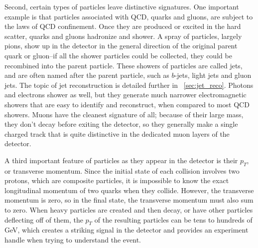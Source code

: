 Second, certain types of particles leave distinctive signatures.  One important example is that particles associated with QCD, quarks and gluons, are subject to the laws of QCD confinement.  Once they are produced or excited in the hard scatter, quarks and gluons hadronize and shower.  A spray of particles, largely pions, show up in the detector in the general direction of the original parent quark or gluon--if all the shower particles could be collected, they could be recombined into the parent particle.  These showers of particles are called jets, and are often named after the parent particle, such as $b$-jets, light jets and gluon jets.  The topic of jet reconstruction is detailed further in ~\ref{sec:jet_reco}.  Photons and electrons shower as well, but they generate much narrower electromagnetic showers that are easy to identify and reconstruct, when compared to most QCD showers.  Muons have the cleanest signature of all; because of their large mass, they don't decay before exiting the detector, so they generally make a single charged track that is quite distinctive in the dedicated muon layers of the detector.

A third important feature of particles as they appear in the detector is their $p_T$, or transverse momentum.  Since the initial state of each collision involves two protons, which are composite particles, it is impossible to know the exact longitudinal momentum of two quarks when they collide.  However, the transverse momentum is zero, so in the final state, the transverse momentum must also sum to zero.  When heavy particles are created and then decay, or have other particles deflecting off of them, the $p_T$ of the resulting particles can be tens to hundreds of GeV, which creates a striking signal in the detector and provides an experiment handle when trying to understand the event.








